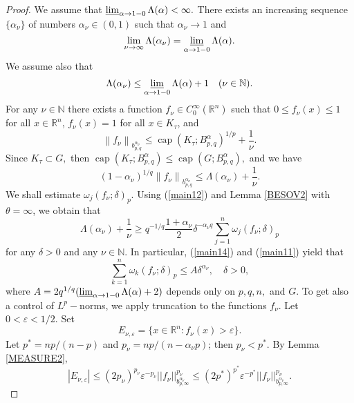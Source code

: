 \documentclass[12pt,twoside,reqno]{amsart}
\numberwithin{equation}{section}
\theoremstyle{definition}
\numberwithin{equation}{section}
\begin{document}
\begin{proof}
We assume that $\varliminf_{{\alpha}\to 1-0}\Lambda({\alpha})<\infty.$ There
exists an increasing sequence $\{{\alpha}_\nu\}$ of numbers ${\alpha}_\nu\in
(0,1)$ such that ${\alpha}_\nu\to 1$ and
\begin{equation}\label{main10}
\lim_{\nu\to\infty} \Lambda({\alpha}_\nu)=\varliminf_{{\alpha}\to 1-0}\Lambda({\alpha}).
\end{equation}
We assume also that
\begin{equation}\label{main11}
\Lambda({\alpha}_\nu)\le \varliminf_{{\alpha}\to 1-0}\Lambda({\alpha})+1 \quad (\nu\in {\mathbb{N}}).
\end{equation}
 For any $\nu\in {\mathbb{N}}$ there
exists a function $f_\nu\in C_0^\infty({\mathbb{R}}^n)$ such that $0\le
f_\nu(x)\le 1$ for all $x\in{\mathbb{R}}^n$, $f_\nu(x)=1$ for all $x\in
K_\tau$, and
$$
\left\|f_\nu\right\|_{b_{p,q}^{{\alpha}_\nu}}\le {\operatorname{cap}}\left(K_\tau;B_{p,q}^{\alpha}\right)^{1/p}+\frac1{\nu}.
$$
Since $K_\tau\subset G,$ then
${\operatorname{cap}}\left(K_\tau;B_{p,q}^{\alpha}\right)\le
{\operatorname{cap}}\left(G;B_{p,q}^{\alpha}\right),$ and we have
\begin{equation}\label{main12}
(1-{\alpha}_\nu)^{1/q}\left\|f_\nu\right\|_{b_{p,q}^{{\alpha}_\nu}}\le \Lambda({\alpha}_\nu) +\frac1{\nu}.
\end{equation}
We shall estimate ${\omega}_j(f_\nu;{\delta})_p.$ Using (\ref{main12}) and Lemma
\ref{BESOV2} with $\theta=\infty$, we obtain that
\begin{equation}\label{main14}
\Lambda({\alpha}_\nu)+\frac1\nu\ge q^{-1/q}\frac{1+{\alpha}_\nu}{2}{\delta}^{-{\alpha}_\nu q}\sum_{j=1}^n{\omega}_j(f_\nu;{\delta})_p
\end{equation}
for any ${\delta}>0$ and any $\nu\in{\mathbb{N}}.$ In particular, (\ref{main14}) and
 (\ref{main11})  yield that
\begin{equation}\label{main15}
\sum_{k=1}^n{\omega}_k(f_\nu;{\delta})_p\le A{\delta}^{{\alpha}_\nu}, \quad {\delta}>0,
\end{equation}
where $A=2q^{1/q}(\varliminf_{{\alpha}\to 1-0}\Lambda({\alpha})+2)$ depends only on $p,q,n,$ and $G.$ To get also a control of $L^p-$norms, we apply truncation
to the functions $f_\nu$. Let $0<{\varepsilon}<1/2.$ Set
$$
E_{\nu,{\varepsilon}}=\{x\in{\mathbb{R}}^n: f_\nu(x)>{\varepsilon}\}.
$$
Let $p^*=np/(n-p)$ and $p_\nu=np/(n-{\alpha}_\nu p)$; then $p_\nu<p^*.$ By
Lemma \ref{MEASURE2},
$$
|E_{\nu,{\varepsilon}}|\le (2p_\nu)^{p_\nu}{\varepsilon}^{-p_\nu}||f_\nu||_{b_{p,\infty}^{{\alpha}_\nu}}^{p_\nu}\le (2p^*)^{p^*}{\varepsilon}^{-p^*}||f_\nu||_{b_{p,\infty}^{{\alpha}_\nu}}^{p_\nu}.
$$
\end{proof}
\end{document}
